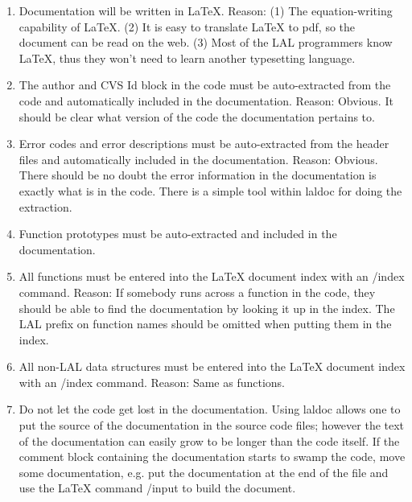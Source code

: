 \documentclass[]{ligodcc}
\begin{document}
\begin{enumerate}
\item
Documentation will be written in LaTeX. Reason: (1) The
equation-writing capability of LaTeX.  (2) It is easy to translate
LaTeX to pdf, so the document can be read on the web. (3) Most of the
LAL programmers know LaTeX, thus they won't need to learn another
typesetting language.
\item
The author and CVS Id block in the code must be auto-extracted
from the code and automatically included in the documentation. Reason:
Obvious. It should be clear what version of the code the documentation
pertains to.
\item
Error codes and error descriptions must be auto-extracted from the
header files and automatically included in the documentation.  Reason:
Obvious. There should be no doubt the error information in the
documentation is exactly what is in the code. There is a simple tool
within laldoc for doing the extraction.
\item
Function prototypes must be auto-extracted and included in the
documentation.
\item
All functions must be entered into the LaTeX document index
with an /index{} command. Reason: If somebody runs across a function
in the code, they should be able to find the documentation  by looking
it up in the index. The LAL prefix on function names should be omitted
when putting them in the index.
\item
All non-LAL data structures  must be entered into the LaTeX
document index with an /index{} command. Reason: Same as functions.
\item
Do not let the code get lost in the documentation. Using
laldoc allows one to put the source of the documentation in the source
code files; however the text of the documentation can easily grow to
be longer than the code itself.  If the comment block containing the
documentation starts to swamp the code, move some documentation,
e.g. put the documentation at the end of the file and use the LaTeX
command  /input{} to build the document.

\end{enumerate}
\end{document}

